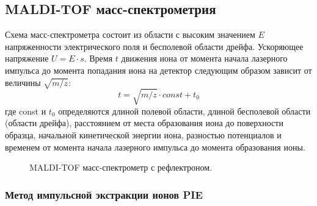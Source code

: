 \documentclass[12pt]{article}
\begin{document}
\begin{flushleft}
\subsection{MALDI-TOF масс-спектрометрия}
Схема масс-спектрометра состоит из области с высоким значением $E$ напряженности электрического поля и бесполевой области дрейфа. Ускоряющее напряжение $U=E\cdot s$.
Время $t$ движения иона от момента начала лазерного импульса
до момента попадания иона на детектор следующим образом зависит от величины $\sqrt{m/z}$:
\[ t= \sqrt{m/z}\cdot const + t_0
\]
где const и $t_0$ определяются длиной полевой области, длиной бесполевой области (области дрейфа), расстоянием от места образования иона до поверхности образца, начальной
кинетической энергии иона, разностью потенциалов и временем от момента начала лазерного импульса до момента образования ионы.
\begin{figure}[!h]
\caption{MALDI-TOF масс-спектрометр с рефлектроном.}
\label{ris:image}
\end{figure}

\subsubsection{Метод импульсной экстракции ионов PIE}


\end{flushleft}
\end{document}

